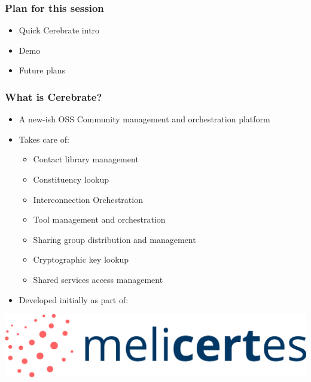 
\begin{frame}[t,plain]
\titlepage
\end{frame}

\begin{frame}
\frametitle{Plan for this session}
    \begin{itemize}
        \item Quick Cerebrate intro
        \item Demo
        \item Future plans
    \end{itemize}
\end{frame}

\begin{frame}
\frametitle{What is Cerebrate?}
    \begin{itemize}
        \item A new-ish OSS Community management and orchestration platform
        \item Takes care of:
        \begin{itemize}
            \item Contact library management
            \item Constituency lookup
            \item Interconnection Orchestration
            \item Tool management and orchestration
            \item Sharing group distribution and management
            \item Cryptographic key lookup
            \item Shared services access management
        \end{itemize}
        \item Developed initially as part of:
    \end{itemize}
    \vspace{0.5em}
    \begin{center}
        \includegraphics[width=0.55\linewidth]{pictures/melicertes.png}
    \end{center}
\end{frame}

